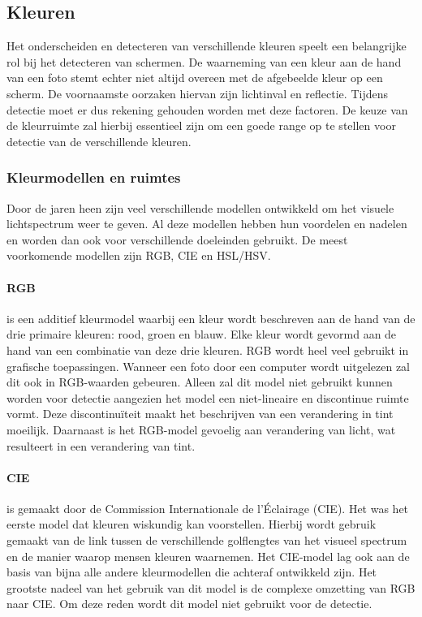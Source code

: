 
\subsection{Kleuren} \label{Kleuren}
Het onderscheiden en detecteren van verschillende kleuren speelt een belangrijke rol bij het detecteren van schermen. De waarneming van een kleur aan de hand van een foto stemt echter niet altijd overeen met de afgebeelde kleur op een scherm. De voornaamste oorzaken hiervan zijn lichtinval en reflectie. Tijdens detectie moet er dus rekening gehouden worden met deze factoren. De keuze van de kleurruimte zal hierbij essentieel zijn om een goede range op te stellen voor detectie van de verschillende kleuren.

\subsubsection{Kleurmodellen en ruimtes}
Door de jaren heen zijn veel verschillende modellen ontwikkeld om het visuele lichtspectrum weer te geven. Al deze modellen hebben hun voordelen en nadelen en worden dan ook voor verschillende doeleinden gebruikt. De meest voorkomende modellen zijn RGB, CIE en HSL/HSV. 
\paragraph{RGB} is een additief kleurmodel waarbij een kleur wordt beschreven aan de hand van de drie primaire kleuren: rood, groen en blauw. Elke kleur wordt gevormd aan de hand van een combinatie van deze drie kleuren. RGB wordt heel veel gebruikt in grafische toepassingen. Wanneer een foto door een computer wordt uitgelezen zal dit ook in RGB-waarden gebeuren. Alleen zal dit model niet gebruikt kunnen worden voor detectie aangezien het model een niet-lineaire en discontinue ruimte vormt. Deze discontinuïteit maakt het beschrijven van een verandering in tint moeilijk. Daarnaast is het RGB-model gevoelig aan verandering van licht, wat resulteert in een verandering van tint. 
\paragraph{CIE} is gemaakt door de Commission Internationale de l'Éclairage (CIE). Het was het eerste model dat kleuren wiskundig kan voorstellen. Hierbij wordt gebruik gemaakt van de link tussen de verschillende golflengtes van het visueel spectrum en de manier waarop mensen kleuren waarnemen. Het CIE-model lag ook aan de basis van bijna alle andere kleurmodellen die achteraf ontwikkeld zijn. Het grootste nadeel van het gebruik van dit model is de complexe omzetting van RGB naar CIE. Om deze reden wordt dit model niet gebruikt voor de detectie.  
